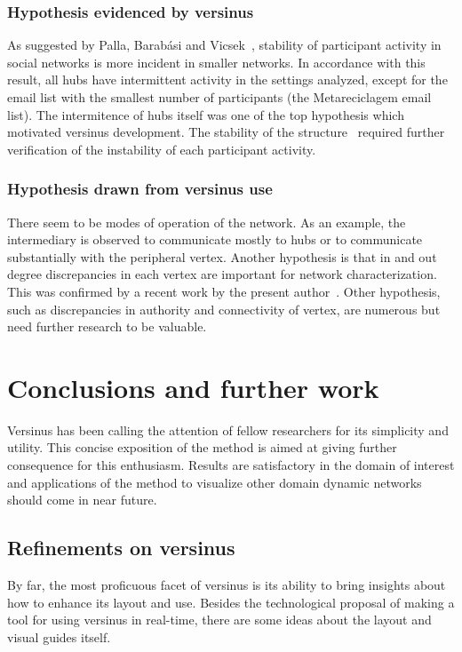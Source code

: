 \documentclass[%
 aip,
 jmp,%
 amsmath,amssymb,
 reprint,%
]{revtex4-1}
\begin{document}
\subsubsection{Hypothesis evidenced by versinus}
As suggested by Palla, Barab\'asi and Vicsek~\cite{barabasiEvo}, stability of participant activity in social networks is more incident in smaller networks. In accordance with this result, all hubs have intermittent activity in the settings analyzed, except for the email list with the smallest number of participants (the Metareciclagem email list). The intermitence of hubs itself was one of the top hypothesis which motivated versinus development. The stability of the structure~\cite{evoSN} required further verification of the instability of each participant activity.

\subsubsection{Hypothesis drawn from versinus use}
There seem to be modes of operation of the network. As an example, the intermediary is observed to communicate mostly to hubs or to communicate substantially with the peripheral vertex. Another hypothesis is that in and out degree discrepancies in each vertex are important for network characterization. This was confirmed by a recent work by the present author~\cite{evoSN}. Other hypothesis, such as discrepancies in authority and connectivity of vertex, are numerous but need further research to be valuable.

\section{Conclusions and further work}\label{conc}
Versinus has been calling the attention of fellow
researchers for its simplicity and utility. This concise
exposition of the method is aimed at giving further
consequence for this enthusiasm. Results are satisfactory
in the domain of interest and applications of the method
to visualize other domain dynamic networks should come in near future.


\subsection{Refinements on versinus}\label{sec:ref}
By far, the most proficuous facet of versinus is its ability
to bring insights about how to enhance its layout and use.
Besides the technological proposal of making a tool for using versinus
in real-time, there are some ideas about the layout and visual guides itself. 
\end{document}
